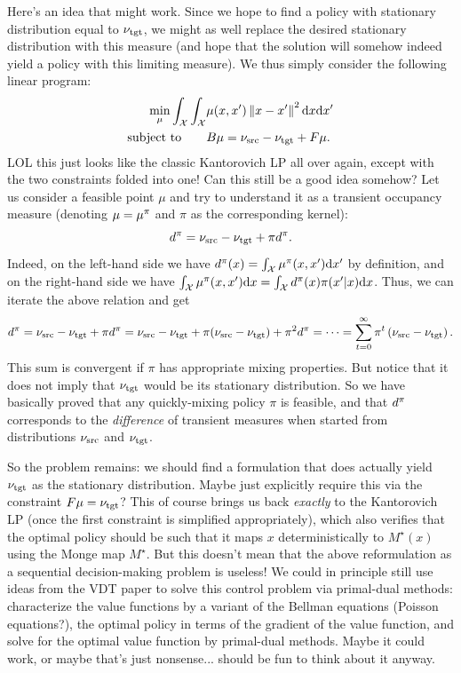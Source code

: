 \documentclass[twoside,10pt]{../jmlr}
\begin{document}
Here's an idea that might work. Since we hope to find a policy with stationary distribution equal to $\nu_{\text{tgt}}$, we might 
as well replace the desired stationary distribution with this measure (and hope that the solution will somehow indeed 
yield a policy with this limiting measure). We thus simply consider the following linear program:
\begin{align*}
 \min_{\mu} \int_{\mathcal{X}} \int_{\mathcal{X}} &\mu(x,x') \left\lVert x-x'\right\rVert^2 \mathrm{d} x \mathrm{d} x'
 \\
 \mbox{subject to} \qquad & B\mu = \nu_{\text{src}} - \nu_{\text{tgt}} + F\mu.
\end{align*}
LOL this just looks like the classic Kantorovich LP all over again, except with the two constraints folded into one! 
Can this still be a good idea somehow? Let us consider a feasible point $\mu$ and try to understand it as a transient 
occupancy measure (denoting $\mu = \mu^\pi$ and $\pi$ as the corresponding kernel):
\[
 d^\pi = \nu_{\text{src}} - \nu_{\text{tgt}} + \pi d^\pi.
\]
Indeed, on the left-hand side we have $d^\pi(x) = \int_{\mathcal{X}} \mu^\pi(x,x') \mathrm{d} x'$ by definition, and on the right-hand 
side we have $\int_{\mathcal{X}} \mu^\pi(x,x') \mathrm{d} x = \int_{\mathcal{X}} d^\pi(x) \pi(x'|x) \mathrm{d} x$. Thus, we can iterate the above relation 
and get
\[
 d^\pi = \nu_{\text{src}} - \nu_{\text{tgt}} + \pi d^\pi = \nu_{\text{src}} - \nu_{\text{tgt}} + \pi(\nu_{\text{src}} - \nu_{\text{tgt}}) + \pi^2 d^\pi = \dots = \sum_{t=0}^\infty \pi^t\left(\nu_{\text{src}} - 
\nu_{\text{tgt}}\right).
\]
This sum is convergent if $\pi$ has appropriate mixing properties. But notice that it does not imply that $\nu_{\text{tgt}}$ would 
be its stationary distribution. So we have basically proved that any quickly-mixing policy $\pi$ is feasible, and that 
$d^\pi$ corresponds to the \emph{difference} of transient measures when started from distributions $\nu_{\text{src}}$ and $\nu_{\text{tgt}}$.

So the problem remains: we should find a formulation that does actually yield $\nu_{\text{tgt}}$ as the stationary distribution. 
Maybe just explicitly require this via the constraint $F\mu = \nu_{\text{tgt}}$?  This of course brings us back \emph{exactly} to the 
Kantorovich LP (once the first constraint is simplified appropriately), which also verifies that the optimal policy 
should be such that it maps $x$ deterministically to $M^\star(x)$ using the Monge map $M^\star$. But this doesn't mean 
that the above reformulation as a sequential decision-making problem is useless! We could in principle still use ideas 
from the VDT paper to solve this control problem via primal-dual methods: characterize the value functions by a variant 
of the Bellman equations (Poisson equations?), the optimal policy in terms of the gradient of the value function, and 
solve for the optimal value function by primal-dual methods. Maybe it could work, or maybe that's just nonsense... 
should be fun to think about it anyway.
\end{document}

